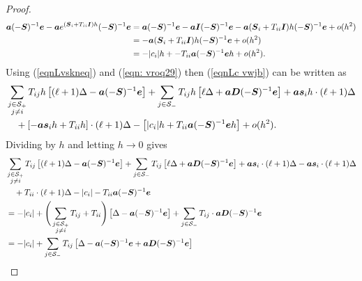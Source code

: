 \begin{proof}
\begin{align}
		\boldsymbol a (-\boldsymbol S)^{-1}\boldsymbol e - \boldsymbol a e^{(\boldsymbol S_i + T_{ii}\boldsymbol I)h} (-\boldsymbol S)^{-1}\boldsymbol e &= \boldsymbol a (-\boldsymbol S)^{-1}\boldsymbol e - \boldsymbol a \boldsymbol I (-\boldsymbol S)^{-1}\boldsymbol e - \boldsymbol a (\boldsymbol S_i + T_{ii}\boldsymbol I)h (-\boldsymbol S)^{-1}\boldsymbol e + o(h^2)\nonumber 
		\\&= - \boldsymbol a (\boldsymbol S_i + T_{ii}\boldsymbol I)h (-\boldsymbol S)^{-1}\boldsymbol e + o(h^2)\nonumber 
		\\&= -|c_i|  h  + -T_{ii}\boldsymbol a(-\boldsymbol S)^{-1}\boldsymbol eh + o(h^2).\label{eqn: vroq29}
	\end{align}
	Using (\ref{eqnLvskneq}) and (\ref{eqn: vroq29}) then (\ref{eqnLc vwjb}) can be written as 
	\begin{align}
		&\sum_{\substack{j\in\mathcal S_+\\j\neq i}}T_{ij}h \left[ (\ell+1)\Delta - \boldsymbol a (-\boldsymbol S)^{-1}\boldsymbol e \right] \nonumber 
		+ \sum_{j\in\mathcal S_-}T_{ij}h \left[ \ell\Delta + \boldsymbol a\boldsymbol D(-\boldsymbol S)^{-1}\boldsymbol e \right] \nonumber
		+ \boldsymbol a \boldsymbol s_i h \cdot (\ell+1)\Delta  \nonumber
		\\&\quad {} + \left[-\boldsymbol a \boldsymbol s_ih  + T_{ii}h \right] \cdot (\ell+1)\Delta - \left[|c_i|  h  + T_{ii}\boldsymbol a(-\boldsymbol S)^{-1}\boldsymbol eh\right] + o(h^2). \label{eqnLc vwjb2}
	\end{align}
	Dividing by \(h\) and letting \(h\to 0\) gives 
	\begin{align}
		& \sum_{\substack{j\in\mathcal S_+\\j\neq i}}T_{ij} \left[ (\ell+1)\Delta - \boldsymbol a (-\boldsymbol S)^{-1}\boldsymbol e \right] \nonumber 
		+ \sum_{j\in\mathcal S_-}T_{ij} \left[ \ell\Delta + \boldsymbol a\boldsymbol D(-\boldsymbol S)^{-1}\boldsymbol e \right] \nonumber
		+ \boldsymbol a \boldsymbol s_i  \cdot (\ell+1)\Delta  \nonumber
		-\boldsymbol a \boldsymbol s_i \cdot (\ell+1)\Delta \\&\quad{} + T_{ii} \cdot (\ell+1)\Delta - |c_i|  - T_{ii}\boldsymbol a(-\boldsymbol S)^{-1}\boldsymbol e \nonumber 
		\\&= -|c_i| + \Bigg(\sum_{\substack{j\in\mathcal S_+\\j\neq i}}T_{ij}+T_{ii}\Bigg) \left[ \Delta - \boldsymbol a (-\boldsymbol S)^{-1}\boldsymbol e \right] \nonumber 
		+ \sum_{j\in\mathcal S_-}T_{ij} \cdot \boldsymbol a\boldsymbol D(-\boldsymbol S)^{-1}\boldsymbol e 
		\\&= -|c_i| + \sum_{j\in\mathcal S_-}T_{ij} \left[ \Delta - \boldsymbol a (-\boldsymbol S)^{-1}\boldsymbol e  +  \boldsymbol a\boldsymbol D(-\boldsymbol S)^{-1}\boldsymbol e \right] \nonumber 
	\end{align}
\end{proof}